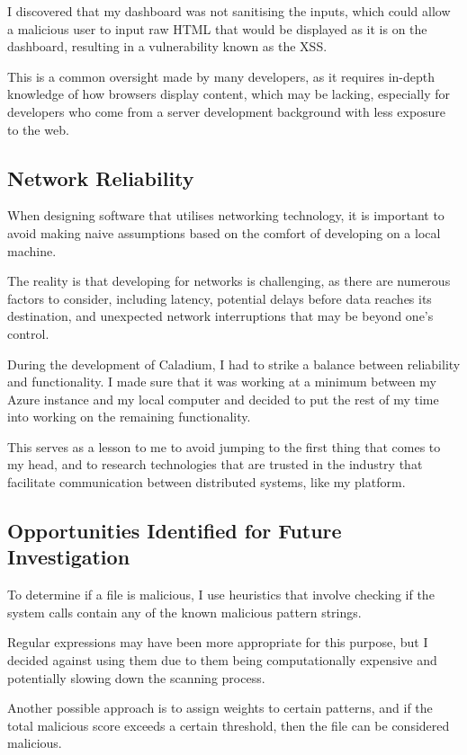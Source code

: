 I discovered that my dashboard was not sanitising the inputs,
which could allow a malicious user to input raw HTML
that would be displayed as it is on the dashboard,
resulting in a vulnerability known as the XSS.

This is a common oversight made by many developers,
as it requires in-depth knowledge of how browsers display content,
which may be lacking, especially for developers who come
from a server development background with less exposure to the web.

\subsection{Network Reliability}
When designing software that utilises networking technology,
it is important to avoid making naive assumptions based
on the comfort of developing on a local machine.

The reality is that developing for networks is challenging,
as there are numerous factors to consider,
including latency, potential delays before data reaches its destination,
and unexpected network interruptions that may be beyond one's control.

During the development of Caladium,
I had to strike a balance between reliability and functionality.
I made sure that it was working at a minimum between
my Azure instance and my local computer and decided to
put the rest of my time into working on the remaining functionality.

This serves as a lesson to me to avoid jumping to the
first thing that comes to my head, and to research technologies
that are trusted in the industry that facilitate communication
between distributed systems, like my platform.

\subsection{Opportunities Identified for Future Investigation}
To determine if a file is malicious,
I use heuristics that involve checking if the system calls
contain any of the known malicious pattern strings.

Regular expressions may have been more appropriate for this purpose,
but I decided against using them due to them being computationally
expensive and potentially slowing down the scanning process.

Another possible approach is to assign weights to certain patterns,
and if the total malicious score exceeds a certain threshold,
then the file can be considered malicious.

